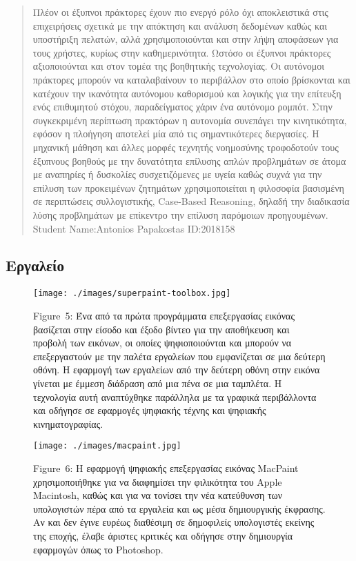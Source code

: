 \documentclass[
]{article}
\begin{document}
\begin{quote}
Πλέον οι έξυπνοι πράκτορες έχουν πιο ενεργό ρόλο όχι αποκλειστικά στις
επιχειρήσεις σχετικά με την απόκτηση και ανάλυση δεδομένων καθώς και
υποστήριξη πελατών, αλλά χρησιμοποιούνται και στην λήψη αποφάσεων για
τους χρήστες, κυρίως στην καθημερινότητα. Ωστόσο οι έξυπνοι πράκτορες
αξιοποιούνται και στον τομέα της βοηθητικής τεχνολογίας. Οι αυτόνομοι
πράκτορες μπορούν να καταλαβαίνουν το περιβάλλον στο οποίο βρίσκονται
και κατέχουν την ικανότητα αυτόνομου καθορισμού και λογικής για την
επίτευξη ενός επιθυμητού στόχου, παραδείγματος χάριν ένα αυτόνομο
ρομπότ. Στην συγκεκριμένη περίπτωση πρακτόρων η αυτονομία συνεπάγει την
κινητικότητα, εφόσον η πλοήγηση αποτελεί μία από τις σημαντικότερες
διεργασίες. Η μηχανική μάθηση και άλλες μορφές τεχνητής νοημοσύνης
τροφοδοτούν τους έξυπνους βοηθούς με την δυνατότητα επίλυσης απλών
προβλημάτων σε άτομα με αναπηρίες ή δυσκολίες συσχετιζόμενες με υγεία
καθώς συχνά για την επίλυση των προκειμένων ζητημάτων χρησιμοποιείται η
φιλοσοφία βασισμένη σε περιπτώσεις συλλογιστικής, Case-Based Reasoning,
δηλαδή την διαδικασία λύσης προβλημάτων με επίκεντρο την επίλυση
παρόμοιων προηγουμένων.\\
Student Name:Antonios Papakostas ID:2018158
\end{quote}

\hypertarget{ux3b5ux3c1ux3b3ux3b1ux3bbux3b5ux3afux3bf}{%
\subsection{Εργαλείο}\label{ux3b5ux3c1ux3b3ux3b1ux3bbux3b5ux3afux3bf}}

\leavevmode{}%
\begin{figure}
\hypertarget{fig:superpaint-toolbox}{%
\centering
\texttt{[image: ./images/superpaint-toolbox.jpg]}
\caption{Figure~5: Ένα από τα πρώτα προγράμματα επεξεργασίας εικόνας
βασίζεται στην είσοδο και έξοδο βίντεο για την αποθήκευση και προβολή
των εικόνων, οι οποίες ψηφιοποιούνται και μπορούν να επεξεργαστούν με
την παλέτα εργαλείων που εμφανίζεται σε μια δεύτερη οθόνη. Η εφαρμογή
των εργαλείων από την δεύτερη οθόνη στην εικόνα γίνεται με έμμεση
διάδραση από μια πένα σε μια ταμπλέτα. Η τεχνολογία αυτή αναπτύχθηκε
παράλληλα με τα γραφικά περιβάλλοντα και οδήγησε σε εφαρμογές ψηφιακής
τέχνης και ψηφιακής κινηματογραφίας.}\label{fig:superpaint-toolbox}
}
\end{figure}

\leavevmode{}%
\begin{figure}
\hypertarget{fig:macpaint}{%
\centering
\texttt{[image: ./images/macpaint.jpg]}
\caption{Figure~6: Η εφαρμογή ψηφιακής επεξεργασίας εικόνας MacPaint
χρησιμοποιήθηκε για να διαφημίσει την φιλικότητα του Apple Macintosh,
καθώς και για να τονίσει την νέα κατεύθυνση των υπολογιστών πέρα από τα
εργαλεία και ως μέσα δημιουργικής έκφρασης. Αν και δεν έγινε ευρέως
διαθέσιμη σε δημοφιλείς υπολογιστές εκείνης της εποχής, έλαβε άριστες
κριτικές και οδήγησε στην δημιουργία εφαρμογών όπως το
Photoshop.}\label{fig:macpaint}
}
\end{figure}
\end{document}

